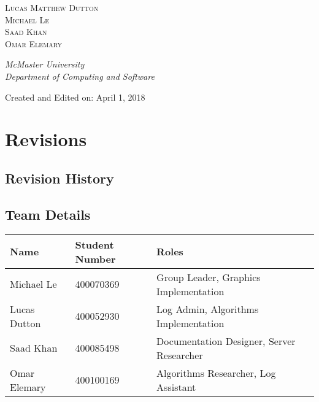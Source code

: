 \documentclass[12pt]{article}
\begin{document}
\begin{titlepage}
	{\scshape\Large Lucas Matthew Dutton \\ Michael Le \\ Saad Khan \\ Omar Elemary\\}
	
	\vspace{0.5\baselineskip} 
	
	\textit{McMaster University \\ Department of Computing and Software} 
	
	\vfill
	
	
	Created and Edited on: April 1, 2018 

\end{titlepage}

\tableofcontents

\newpage

\section{Revisions}

\subsection{Revision History}


\newpage

\subsection{Team Details}

\begin{table}[h]
\begin{tabular}{| l | l | l |}
\hline
Name & Student Number & Roles \\ 
\hline
Michael Le & 400070369 & Group Leader, Graphics Implementation\\ 
\hline
Lucas Dutton & 400052930 & Log Admin, Algorithms Implementation\\ 
\hline
Saad Khan & 400085498 & Documentation Designer, Server Researcher\\ 
\hline
Omar Elemary & 400100169 & Algorithms Researcher, Log Assistant\\ 
\hline
\end{tabular}
\end{table}
\end{document}
